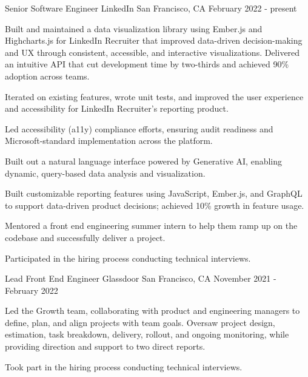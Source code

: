 
\begin{cventries}

  \cventry
    {Senior Software Engineer} %
    {LinkedIn} %
    {San Francisco, CA} %
    {February 2022 - present} %
    {
      \begin{cvitems} %
        \item {Built and maintained a data visualization library using Ember.js and Highcharts.js for LinkedIn Recruiter that improved data-driven decision-making and UX through consistent, accessible, and interactive visualizations. 
        Delivered an intuitive API that cut development time by two-thirds and achieved 90\% adoption across teams.}
        \item {Iterated on existing features, wrote unit tests, and improved the user experience and accessibility for LinkedIn Recruiter's reporting product.} 
        \item {Led accessibility (a11y) compliance efforts, ensuring audit readiness and Microsoft-standard implementation across the platform.} 
        \item {Built out a natural language interface powered by Generative AI, enabling dynamic, query-based data analysis and visualization.}
        \item {Built customizable reporting features using JavaScript, Ember.js, and GraphQL to support data-driven product decisions; achieved 10\% growth in feature usage.}
        \item {Mentored a front end engineering summer intern to help them ramp up on the codebase and successfully deliver a project.} 
        \item {Participated in the hiring process conducting technical interviews.}
      \end{cvitems}
    }

  \cventry
    {Lead Front End Engineer} %
    {Glassdoor} %
    {San Francisco, CA} %
    {November 2021 - February 2022} %
    {
      \begin{cvitems} %
        \item {Led the Growth team, collaborating with product and engineering managers to define, plan, and align projects with team goals. Oversaw project design, estimation, task breakdown, delivery, rollout, and ongoing monitoring, while providing direction and support to two direct reports.}
        \item {Took part in the hiring process conducting technical interviews.}
      \end{cvitems}
    }


\end{cventries}
